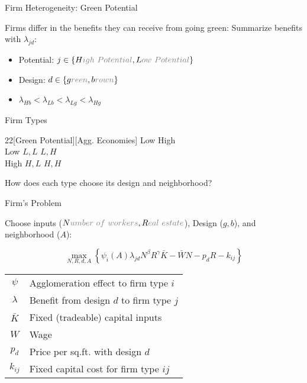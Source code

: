 \documentclass[11pt, dvipsnames, usenames]{beamer}
\begin{document}
\begin{frame}{Firm Heterogeneity: Green Potential}

Firms differ in the benefits they can receive from going green:
%
\vfill
Summarize benefits with $\lambda_{jd}$:
\begin{itemize}
	\item Potential: $j \in \{ H\textcolor{gray}{igh~Potential} , L\textcolor{gray}{ow~Potential} \}$
	\item Design: $d \in \{ g\textcolor{gray}{reen}, b\textcolor{gray}{rown} \}$
	\item $\lambda_{Hb} < \lambda_{Lb} < \lambda_{Lg} < \lambda_{Hg}$ 
\end{itemize}
\end{frame}


\begin{frame}{Firm Types}

\hspace{1cm}
\begin{game}{2}{2}[Green Potential][Agg. Economies]
            \> Low \> High \\
        Low \> $L, L$ \> $L, H$\\
        High \> $H, L$ \> $H, H$\\
\end{game}

\vfill
How does each type choose its design and neighborhood?

\end{frame}


\begin{frame}{Firm's Problem}

Choose inputs ($N\textcolor{gray}{umber~of~workers}, R\textcolor{gray}{eal~estate}$), Design ($g, b$), and neighborhood ($A$): 

\vfill
$$\max_{N, R, d, A} \left\{ \psi_i(A) \lambda_{jd} N^\beta R^\gamma \bar{K} - \bar{W}N - p_d R - k_{ij} \right\}$$

\vfill
\centering
\begin{tabular}{c l}
$\psi$ & Agglomeration effect to firm type $i$\\
$\lambda$ & Benefit from design $d$ to firm type $j$\\
$\bar{K}$ & Fixed (tradeable) capital inputs\\
$W$ & Wage\\
$p_d$ & Price per sq.ft. with design $d$\\
$k_{ij}$ & Fixed capital cost for firm type $ij$  
\end{tabular}

\end{frame}
\end{document}
